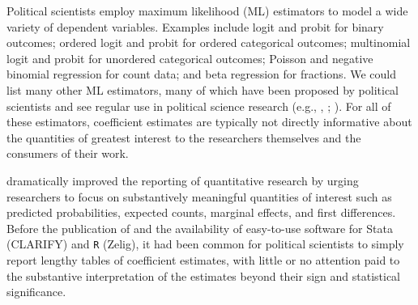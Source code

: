 \documentclass[11pt]{article}
\begin{document}


\thispagestyle{empty}

\onehalfspace



Political scientists employ maximum likelihood (ML) estimators to model a wide variety of dependent variables. Examples include logit and probit for binary outcomes; ordered logit and probit for ordered categorical outcomes; multinomial logit and probit for unordered categorical outcomes; Poisson and negative binomial regression for count data; and beta regression for fractions. We could list many other ML estimators, many of which have been proposed by political scientists and see regular use in political science research (e.g., \citealt{Nagler1994}, \citealt{KatzKing1999}; \citealt{Mebane2000}). For all of these estimators, coefficient estimates are typically not directly informative about the quantities of greatest interest to the researchers themselves and the consumers of their work.



\cite{KingTomzWittenberg2000} dramatically improved the reporting of quantitative research by urging researchers to focus on substantively meaningful quantities of interest such as predicted probabilities, expected counts, marginal effects, and first differences. Before the publication of \cite{KingTomzWittenberg2000} and the availability of easy-to-use software for Stata (CLARIFY) and \texttt{R} (Zelig), it had been common for political scientists to simply report lengthy tables of coefficient estimates, with little or no attention paid to the substantive interpretation of the estimates beyond their sign and statistical significance.
\end{document}
